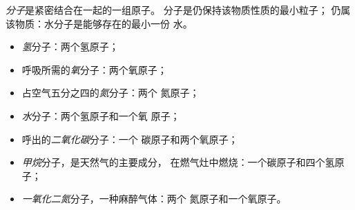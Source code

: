 \begin{definition}[分子]\label{def:g7:atoms-and-molecules:molecule}
\emph{分子}是紧密结合在一起的一组原子。
分子是仍保持该物质性质的最小粒子；
仍属该物质：水分子是能够存在的最小一份
水。
\end{definition}

\begin{example}[七种分子]\label{ex:g7:atoms-and-molecules:seven}
\begin{itemize}
  \item \emph{氢}分子：两个氢原子；
  \item 呼吸所需的\emph{氧}分子：两个氧原子；
  \item 占空气五分之四的\emph{氮}分子：两个
        氮原子；
  \item \emph{水}分子：两个氢原子和一个氧
        原子；
  \item 呼出的\emph{二氧化碳}分子：一个
        碳原子和两个氧原子；
  \item \emph{甲烷}分子，是天然气的主要成分，
        在燃气灶中燃烧：一个碳原子和四个氢原子；
  \item \emph{一氧化二氮}分子，一种麻醉气体：两个
        氮原子和一个氧原子。
\end{itemize}
\end{example}

